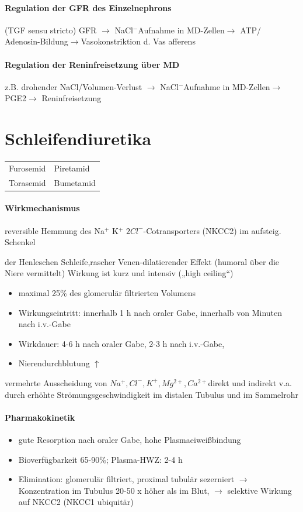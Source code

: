 \documentclass[10pt,a4paper]{report}
\begin{document}
\paragraph{Regulation der GFR des Einzelnephrons} 
(TGF sensu stricto) GFR $\rightarrow$ NaCl$^-$Aufnahme in MD-Zellen$\rightarrow$ ATP/ Adenosin-Bildung$\rightarrow$Vasokonstriktion d. Vas afferens
\paragraph{Regulation der Reninfreisetzung über MD} z.B. drohender 
NaCl/Volumen-Verlust $\rightarrow$ NaCl$^-$Aufnahme in MD-Zellen$\rightarrow$ PGE2$\rightarrow$ Reninfreisetzung
\section{Schleifendiuretika}
\begin{tabularx}{\textwidth}{XX}
Furosemid&Piretamid\\ 	  
Torasemid&Bumetamid\\
\end{tabularx}
\paragraph{Wirkmechanismus}
reversible Hemmung des Na$^+$ K$^+$ $2Cl^-$-Cotransporters (NKCC2) im aufsteig. Schenkel 


der Henleschen Schleife,rascher Venen-dilatierender Effekt (humoral über die Niere vermittelt)	Wirkung ist kurz und intensiv („high ceiling“)
\begin{itemize}
	\item maximal 25\% des glomerulär filtrierten Volumens
	\item Wirkungseintritt: innerhalb 1 h nach oraler Gabe, innerhalb von Minuten nach i.v.-Gabe
	\item Wirkdauer:	4-6 h nach oraler Gabe, 2-3 h nach i.v.-Gabe, 
	\item Nierendurchblutung $\uparrow$
\end{itemize}
vermehrte Ausscheidung von $Na^+, Cl^-, K^+, Mg^{2+}, Ca^{2+}$direkt und indirekt v.a. durch erhöhte Strömungsgeschwindigkeit im distalen Tubulus und im Sammelrohr
\paragraph{Pharmakokinetik}
\begin{itemize}
	\item gute Resorption nach oraler Gabe, hohe Plasmaeiweißbindung
	\item Bioverfügbarkeit 65-90\%; Plasma-HWZ: 2-4 h
	\item Elimination:	glomerulär filtriert, proximal tubulär sezerniert $\rightarrow$ Konzentration im Tubulus 20-50 x höher als im Blut, $\rightarrow$ selektive Wirkung auf NKCC2 (NKCC1 ubiquitär)
\end{itemize}
\end{document}
